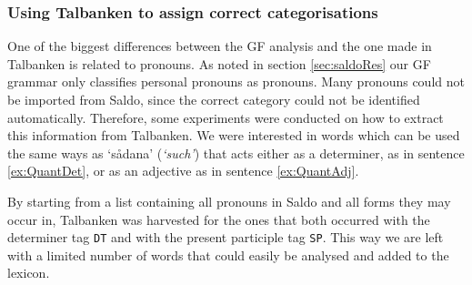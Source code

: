 \documentclass{report}
\begin{document}



\subsubsection{Using Talbanken to assign correct categorisations}
\label{sec:gf.quant}
One of the biggest differences between the GF analysis and the one made in Talbanken
is related to pronouns. 
As noted in section \ref{sec:saldoRes} our GF grammar only classifies personal pronouns
as pronouns. Many pronouns could not be imported from Saldo, since the correct category
could not be identified automatically. Therefore, some experiments were
conducted on how to extract this 
information from Talbanken. We were interested in words which can be used
the same ways as `sådana' (\emph{`such'}) that acts either as a
determiner, as in sentence \ref{ex:QuantDet}, or as an adjective as
 in sentence \ref{ex:QuantAdj}. 

By starting from a list containing all pronouns in Saldo and all forms they may occur in,
Talbanken was harvested for the ones that both occurred with the determiner tag \verb-DT-
and with the present participle tag \verb-SP-. This way we are left with a limited number
of words that could easily be analysed and added to the lexicon.
\end{document}
